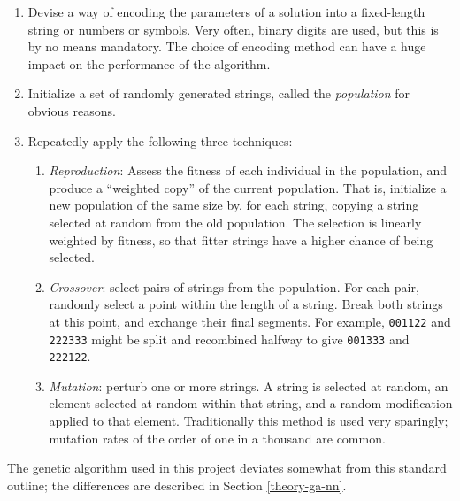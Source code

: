 \begin{enumerate}

\item Devise a way of encoding the parameters of a solution into a
  fixed-length string or numbers or symbols. Very often, binary digits
  are used, but this is by no means mandatory. The choice of encoding
  method can have a huge impact on the performance of the algorithm.

\item Initialize a set of randomly generated strings, called the
  \emph{population} for obvious reasons.

\item Repeatedly apply the following three techniques:

  \begin{enumerate}
    
  \item \emph{Reproduction}: Assess the fitness of each individual in
    the population, and produce a ``weighted copy'' of the current
    population. That is, initialize a new population of the same size
    by, for each string, copying a string selected at random from the
    old population. The selection is linearly weighted by fitness, so
    that fitter strings have a higher chance of being selected.

  \item \emph{Crossover}: select pairs of strings from the
    population. For each pair, randomly select a point within the
    length of a string. Break both strings at this point, and exchange
    their final segments. For example, \texttt{001122} and
    \texttt{222333} might be split and recombined halfway to give
    \texttt{001333} and \texttt{222122}.
    
  \item \emph{Mutation}: perturb one or more strings. A string is
    selected at random, an element selected at random within that
    string, and a random modification applied to that element.
    Traditionally this method is used very sparingly; mutation rates
    of the order of one in a thousand are common.
 
  \end{enumerate}

\end{enumerate}

The genetic algorithm used in this project deviates somewhat from this
standard outline; the differences are described in Section
\ref{theory-ga-nn}.
